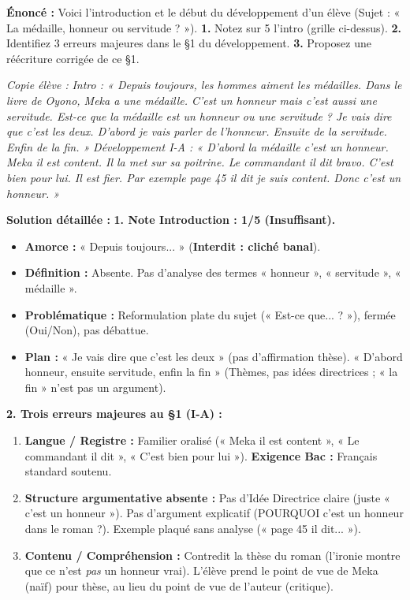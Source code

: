 \documentclass[11pt]{article}
\begin{document}
\begin{exoresolu}
\textbf{Énoncé :} Voici l'introduction et le début du développement d'un élève (Sujet : « La médaille, honneur ou servitude ? »). \textbf{1.} Notez sur 5 l'intro (grille ci-dessus). \textbf{2.} Identifiez 3 erreurs majeures dans le §1 du développement. \textbf{3.} Proposez une réécriture corrigée de ce §1.

\textit{Copie élève :}
\textit{Intro : « Depuis toujours, les hommes aiment les médailles. Dans le livre de Oyono, Meka a une médaille. C'est un honneur mais c'est aussi une servitude. Est-ce que la médaille est un honneur ou une servitude ? Je vais dire que c'est les deux. D'abord je vais parler de l'honneur. Ensuite de la servitude. Enfin de la fin. »}
\textit{Développement I-A : « D'abord la médaille c'est un honneur. Meka il est content. Il la met sur sa poitrine. Le commandant il dit bravo. C'est bien pour lui. Il est fier. Par exemple page 45 il dit je suis content. Donc c'est un honneur. »}

\tcblower
\textbf{Solution détaillée :}
\textbf{1. Note Introduction : 1/5 (Insuffisant).}
\begin{itemize}
    \item \textbf{Amorce :} « Depuis toujours... » (\textbf{Interdit : cliché banal}).
    \item \textbf{Définition :} Absente. Pas d'analyse des termes « honneur », « servitude », « médaille ».
    \item \textbf{Problématique :} Reformulation plate du sujet (« Est-ce que... ? »), fermée (Oui/Non), pas débattue.
    \item \textbf{Plan :} « Je vais dire que c'est les deux » (pas d'affirmation thèse). « D'abord honneur, ensuite servitude, enfin la fin » (Thèmes, pas idées directrices ; « la fin » n'est pas un argument).
\end{itemize}

\textbf{2. Trois erreurs majeures au §1 (I-A) :}
\begin{enumerate}
    \item \textbf{Langue / Registre :} Familier oralisé (« Meka il est content », « Le commandant il dit », « C'est bien pour lui »). \textbf{Exigence Bac :} Français standard soutenu.
    \item \textbf{Structure argumentative absente :} Pas d'Idée Directrice claire (juste « c'est un honneur »). Pas d'argument explicatif (POURQUOI c'est un honneur dans le roman ?). Exemple plaqué sans analyse (« page 45 il dit... »).
    \item \textbf{Contenu / Compréhension :} Contredit la thèse du roman (l'ironie montre que ce n'est \emph{pas} un honneur vrai). L'élève prend le point de vue de Meka (naïf) pour thèse, au lieu du point de vue de l'auteur (critique).
\end{enumerate}


\end{exoresolu}
\end{document}
